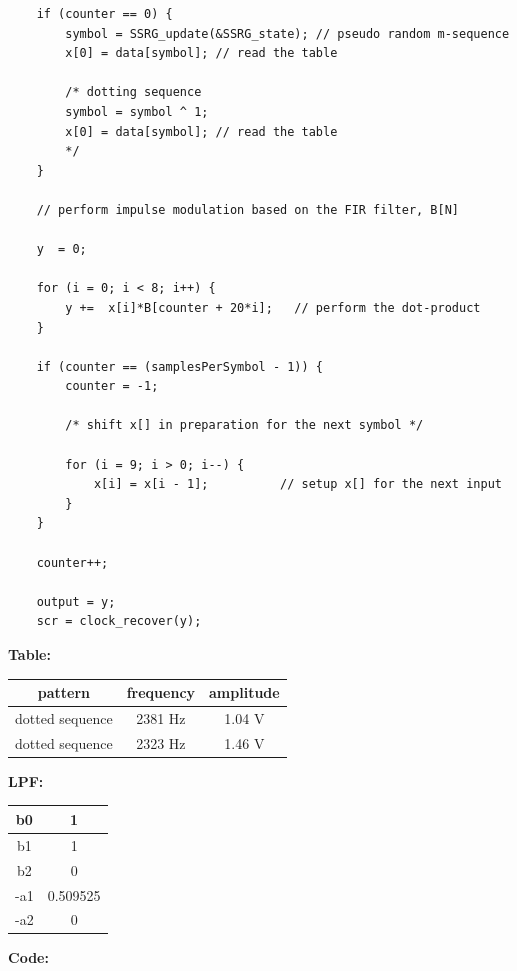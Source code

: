 \documentclass{article}
\begin{document}
\begin{verbatim}
	if (counter == 0) {
		symbol = SSRG_update(&SSRG_state); // pseudo random m-sequence
		x[0] = data[symbol]; // read the table

		/* dotting sequence
		symbol = symbol ^ 1;
		x[0] = data[symbol]; // read the table
		*/
	}

	// perform impulse modulation based on the FIR filter, B[N] 

	y  = 0;

	for (i = 0; i < 8; i++) {
		y +=  x[i]*B[counter + 20*i];	// perform the dot-product
	}

	if (counter == (samplesPerSymbol - 1)) {
		counter = -1; 

		/* shift x[] in preparation for the next symbol */

		for (i = 9; i > 0; i--) {
			x[i] = x[i - 1];          // setup x[] for the next input
		}
	}

	counter++;

	output = y;
	scr = clock_recover(y);
\end{verbatim}

\textbf{Table:}

\begin{center}
\begin{tabular}{c|c|c}
pattern	&	frequency & amplitude \\ \hline
dotted sequence	&	 2381 Hz	&	1.04 V				\\ \hline
dotted sequence	&	 2323 Hz	&	1.46 V
\end{tabular}
\end{center}

\textbf{LPF:}

\begin{center}
\begin{tabular}{c|c}
b0	&	 1				\\ \hline
b1	&  1				\\ \hline
b2	&  0				\\ \hline
-a1	&	 0.509525\\ \hline
-a2	&	 0
\end{tabular}
\end{center}

\textbf{Code:}
\end{document}

